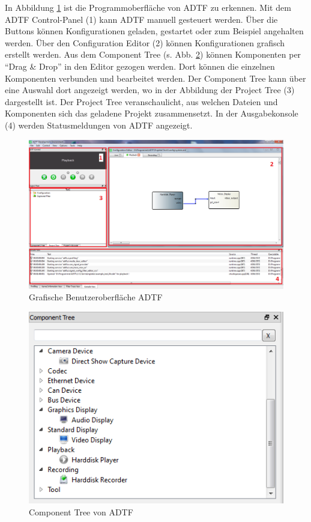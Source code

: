 \documentclass[12pt,a4paper]{report}
\begin{document}
In Abbildung \ref{pic:Graphische Benutzeroberflaeche ADTF} ist die Programmoberfläche von ADTF zu erkennen. Mit dem ADTF Control-Panel (1) kann ADTF manuell gesteuert werden. Über die Buttons können Konfigurationen geladen, gestartet oder zum Beispiel angehalten werden. Über den Configuration Editor (2) können Konfigurationen grafisch erstellt werden. Aus dem Component Tree (s. Abb. \ref{pic:Component Tree von ADTF}) können Komponenten per "`Drag \& Drop"' in den Editor gezogen werden. Dort können die einzelnen Komponenten verbunden und bearbeitet werden. Der Component Tree kann über eine Auswahl dort angezeigt werden, wo in der Abbildung der Project Tree (3) dargestellt ist. Der Project Tree veranschaulicht, aus welchen Dateien und Komponenten sich das geladene Projekt zusammensetzt. In der Ausgabekonsole (4) werden Statusmeldungen von ADTF angezeigt.
\begin{figure}
\begin{center}
\includegraphics[width=1\linewidth]{Darstellungen/ADTF_uebersicht_markiert}
\caption{Grafische Benutzeroberfläche ADTF}\label{pic:Graphische Benutzeroberflaeche ADTF}
\end{center}
\end{figure}
\begin{figure}
\begin{center}
\includegraphics[scale=0.6]{Darstellungen/ADTF_componenttree}
\caption{Component Tree von ADTF}\label{pic:Component Tree von ADTF}
\end{center}
\end{figure}
\end{document}
